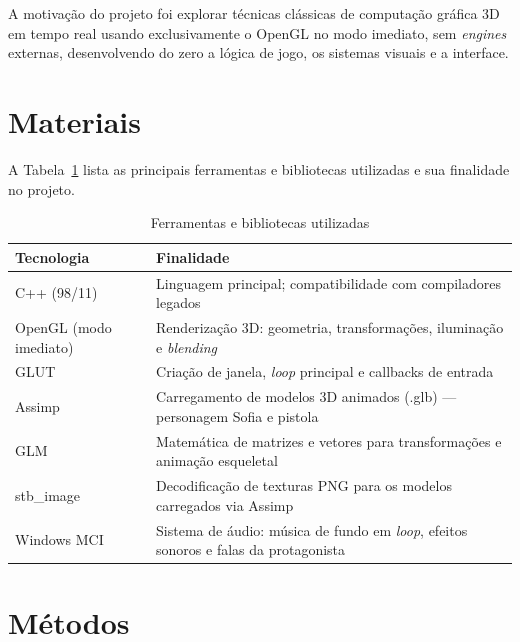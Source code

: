 \documentclass[12pt,a4paper]{article}
\begin{document}
A motivação do projeto foi explorar técnicas clássicas de computação gráfica
3D em tempo real usando exclusivamente o OpenGL no modo imediato, sem
\textit{engines} externas, desenvolvendo do zero a lógica de jogo, os
sistemas visuais e a interface.

\section{Materiais}

A Tabela~\ref{tab:materiais} lista as principais ferramentas e bibliotecas
utilizadas e sua finalidade no projeto.

\begin{table}[H]
\caption{Ferramentas e bibliotecas utilizadas}
\label{tab:materiais}
\centering
\begin{tabular}{|l|p{9cm}|}
\hline
\textbf{Tecnologia} & \textbf{Finalidade} \\
\hline
C++ (98/11) & Linguagem principal; compatibilidade com compiladores legados \\
\hline
OpenGL (modo imediato) & Renderização 3D: geometria, transformações, iluminação e \textit{blending} \\
\hline
GLUT & Criação de janela, \textit{loop} principal e callbacks de entrada \\
\hline
Assimp & Carregamento de modelos 3D animados (.glb) — personagem Sofia e pistola \\
\hline
GLM & Matemática de matrizes e vetores para transformações e animação esqueletal \\
\hline
stb\_image & Decodificação de texturas PNG para os modelos carregados via Assimp \\
\hline
Windows MCI & Sistema de áudio: música de fundo em \textit{loop}, efeitos sonoros e falas da protagonista \\
\hline
\end{tabular}
\end{table}

\section{Métodos}
\end{document}
